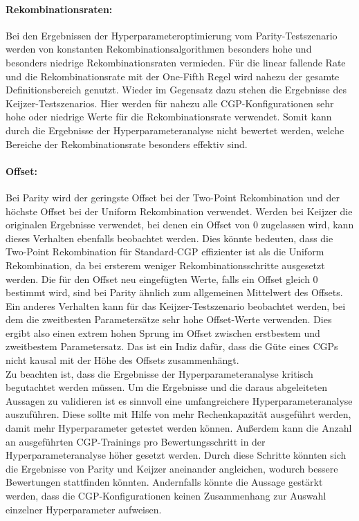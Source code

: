 \paragraph{Rekombinationsraten:} Bei den Ergebnissen der Hyperparameteroptimierung vom Pa\-ri\-ty-Test\-sze\-na\-rio werden von konstanten Rekombinationsalgorithmen besonders hohe und besonders niedrige Rekombinationsraten vermieden.
Für die linear fallende Rate und die Rekombinationsrate mit der One-Fifth Regel wird nahezu der gesamte Definitionsbereich genutzt.
Wieder im Gegensatz dazu stehen die Ergebnisse des Keijzer-Testszenarios.
Hier werden für nahezu alle CGP-Konfigurationen sehr hohe oder niedrige Werte für die Rekombinationsrate verwendet.
Somit kann durch die Ergebnisse der Hyperparameteranalyse nicht bewertet werden, welche Bereiche der Rekombinationsrate besonders effektiv sind.\\
\paragraph{Offset:} Bei Parity wird der geringste Offset bei der Two-Point Rekombination und der höchste Offset bei der Uniform Rekombination verwendet.
Werden bei Keijzer die originalen Ergebnisse verwendet, bei denen ein Offset von 0 zugelassen wird, kann dieses Verhalten ebenfalls beobachtet werden.
Dies könnte bedeuten, dass die Two-Point Rekombination für Standard-CGP effizienter ist als die Uniform Rekombination, da bei ersterem weniger Rekombinationsschritte ausgesetzt werden.
Die für den Offset neu eingefügten Werte, falls ein Offset gleich 0 bestimmt wird, sind bei Parity ähnlich zum allgemeinen Mittelwert des Offsets.
Ein anderes Verhalten kann für das Keijzer-Testszenario beobachtet werden, bei dem die zweitbesten Parametersätze sehr hohe Offset-Werte verwenden.
Dies ergibt also einen extrem hohen Sprung im Offset zwischen erstbestem und zweitbestem Parametersatz.
Das ist ein Indiz dafür, dass die Güte eines CGPs nicht kausal mit der Höhe des Offsets zusammenhängt.\\
Zu beachten ist, dass die Ergebnisse der Hyperparameteranalyse kritisch begutachtet werden müssen.
Um die Ergebnisse und die daraus abgeleiteten Aussagen zu validieren ist es sinnvoll eine umfangreichere Hyperparameteranalyse auszuführen.
Diese sollte mit Hilfe von mehr Rechenkapazität ausgeführt werden, damit mehr Hyperparameter getestet werden können.
Außerdem kann die Anzahl an ausgeführten CGP-Trainings pro Bewertungsschritt in der Hyperparameteranalyse höher gesetzt werden.
Durch diese Schritte könnten sich die Ergebnisse von Parity und Keijzer aneinander angleichen, wodurch bessere Bewertungen stattfinden könnten.
Andernfalls könnte die Aussage gestärkt werden, dass die CGP-Konfigurationen keinen Zusammenhang zur Auswahl einzelner Hyperparameter aufweisen.

